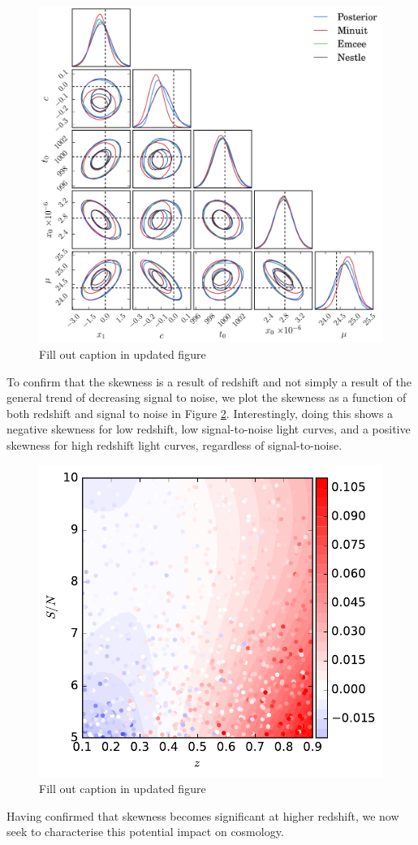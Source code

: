 \documentclass[a4paper,fleqn,usenatbib]{mnras}
\newcommand{\red}{\color{red}}
\begin{document}
\begin{figure}
	\includegraphics[width=\textwidth]{../output/bias_surface.png}
	\caption{{\red Fill out caption in updated figure}}
	\label{fig:example}
\end{figure}
To confirm that the skewness is a result of redshift and not simply a result of the general trend of decreasing signal to noise, we plot the skewness as a function of both redshift and signal to noise in Figure \ref{fig:bias_skew}. Interestingly, doing this shows a negative skewness for low redshift, low signal-to-noise light curves, and a positive skewness for high redshift light curves, regardless of signal-to-noise.
\begin{figure}
	\includegraphics[width=\columnwidth]{../output/bias.pdf}
	\caption{{\red Fill out caption in updated figure}}
	\label{fig:bias_skew}
\end{figure}
Having confirmed that skewness becomes significant at higher redshift, we now seek to characterise this potential impact on cosmology.
\end{document}
